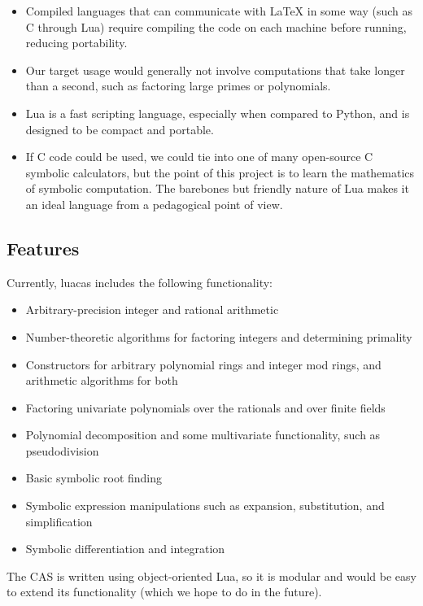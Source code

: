 \documentclass{article}
\begin{document}
\begin{itemize}
    \item Compiled languages that can communicate with \LaTeX{} in some way (such as C through Lua) require compiling the code on each machine before running, reducing portability.
    \item Our target usage would generally not involve computations that take longer than a second, such as factoring large primes or polynomials.
    \item Lua is a fast scripting language, especially when compared to Python, and is designed to be compact and portable.
    \item If C code could be used, we could tie into one of many open-source C symbolic calculators, but the point of this project is to learn the mathematics of symbolic computation. The barebones but friendly nature of Lua makes it an ideal language from a pedagogical point of view.
\end{itemize}

\subsection{Features}
                
Currently, {\ttfamily luacas} includes the following functionality:
                
\begin{itemize}
    \item Arbitrary-precision integer and rational arithmetic
    \item Number-theoretic algorithms for factoring integers and determining primality
    \item Constructors for arbitrary polynomial rings and integer mod rings, and arithmetic algorithms for both
    \item Factoring univariate polynomials over the rationals and over finite fields
    \item Polynomial decomposition and some multivariate functionality, such as pseudodivision
    \item Basic symbolic root finding
    \item Symbolic expression manipulations such as expansion, substitution, and simplification
    \item Symbolic differentiation and integration
\end{itemize}
                
The CAS is written using object-oriented Lua, so it is modular and would be easy to extend its functionality (which we hope to do in the future).
\end{document}
